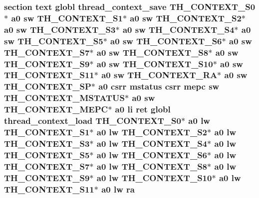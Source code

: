 \hypertarget{riscv_2threada_8S_adbd61e12947f26b6b8bf0fdb15f61d87}{
\subsubsection[{ra}]{\setlength{\rightskip}{0pt plus 5cm}section text globl {\bf thread\-\_\-context\-\_\-save} {\bf T\-H\-\_\-\-C\-O\-N\-T\-E\-X\-T\-\_\-\-S0}$\ast$ {\bf a0} {\bf sw} {\bf T\-H\-\_\-\-C\-O\-N\-T\-E\-X\-T\-\_\-\-S1}$\ast$ {\bf a0} {\bf sw} {\bf T\-H\-\_\-\-C\-O\-N\-T\-E\-X\-T\-\_\-\-S2}$\ast$ {\bf a0} {\bf sw} {\bf T\-H\-\_\-\-C\-O\-N\-T\-E\-X\-T\-\_\-\-S3}$\ast$ {\bf a0} {\bf sw} {\bf T\-H\-\_\-\-C\-O\-N\-T\-E\-X\-T\-\_\-\-S4}$\ast$ {\bf a0} {\bf sw} {\bf T\-H\-\_\-\-C\-O\-N\-T\-E\-X\-T\-\_\-\-S5}$\ast$ {\bf a0} {\bf sw} {\bf T\-H\-\_\-\-C\-O\-N\-T\-E\-X\-T\-\_\-\-S6}$\ast$ {\bf a0} {\bf sw} {\bf T\-H\-\_\-\-C\-O\-N\-T\-E\-X\-T\-\_\-\-S7}$\ast$ {\bf a0} {\bf sw} {\bf T\-H\-\_\-\-C\-O\-N\-T\-E\-X\-T\-\_\-\-S8}$\ast$ {\bf a0} {\bf sw} {\bf T\-H\-\_\-\-C\-O\-N\-T\-E\-X\-T\-\_\-\-S9}$\ast$ {\bf a0} {\bf sw} {\bf T\-H\-\_\-\-C\-O\-N\-T\-E\-X\-T\-\_\-\-S10}$\ast$ {\bf a0} {\bf sw} {\bf T\-H\-\_\-\-C\-O\-N\-T\-E\-X\-T\-\_\-\-S11}$\ast$ {\bf a0} {\bf sw} {\bf T\-H\-\_\-\-C\-O\-N\-T\-E\-X\-T\-\_\-\-R\-A}$\ast$ {\bf a0} {\bf sw} {\bf T\-H\-\_\-\-C\-O\-N\-T\-E\-X\-T\-\_\-\-S\-P}$\ast$ {\bf a0} csrr {\bf mstatus} csrr {\bf mepc} {\bf sw} {\bf T\-H\-\_\-\-C\-O\-N\-T\-E\-X\-T\-\_\-\-M\-S\-T\-A\-T\-U\-S}$\ast$ {\bf a0} {\bf sw} {\bf T\-H\-\_\-\-C\-O\-N\-T\-E\-X\-T\-\_\-\-M\-E\-P\-C}$\ast$ {\bf a0} {\bf li} ret globl {\bf thread\-\_\-context\-\_\-load} {\bf T\-H\-\_\-\-C\-O\-N\-T\-E\-X\-T\-\_\-\-S0}$\ast$ {\bf a0} {\bf lw} {\bf T\-H\-\_\-\-C\-O\-N\-T\-E\-X\-T\-\_\-\-S1}$\ast$ {\bf a0} {\bf lw} {\bf T\-H\-\_\-\-C\-O\-N\-T\-E\-X\-T\-\_\-\-S2}$\ast$ {\bf a0} {\bf lw} {\bf T\-H\-\_\-\-C\-O\-N\-T\-E\-X\-T\-\_\-\-S3}$\ast$ {\bf a0} {\bf lw} {\bf T\-H\-\_\-\-C\-O\-N\-T\-E\-X\-T\-\_\-\-S4}$\ast$ {\bf a0} {\bf lw} {\bf T\-H\-\_\-\-C\-O\-N\-T\-E\-X\-T\-\_\-\-S5}$\ast$ {\bf a0} {\bf lw} {\bf T\-H\-\_\-\-C\-O\-N\-T\-E\-X\-T\-\_\-\-S6}$\ast$ {\bf a0} {\bf lw} {\bf T\-H\-\_\-\-C\-O\-N\-T\-E\-X\-T\-\_\-\-S7}$\ast$ {\bf a0} {\bf lw} {\bf T\-H\-\_\-\-C\-O\-N\-T\-E\-X\-T\-\_\-\-S8}$\ast$ {\bf a0} {\bf lw} {\bf T\-H\-\_\-\-C\-O\-N\-T\-E\-X\-T\-\_\-\-S9}$\ast$ {\bf a0} {\bf lw} {\bf T\-H\-\_\-\-C\-O\-N\-T\-E\-X\-T\-\_\-\-S10}$\ast$ {\bf a0} {\bf lw} {\bf T\-H\-\_\-\-C\-O\-N\-T\-E\-X\-T\-\_\-\-S11}$\ast$ {\bf a0} {\bf lw} ra}}\label{riscv_2threada_8S_adbd61e12947f26b6b8bf0fdb15f61d87}
